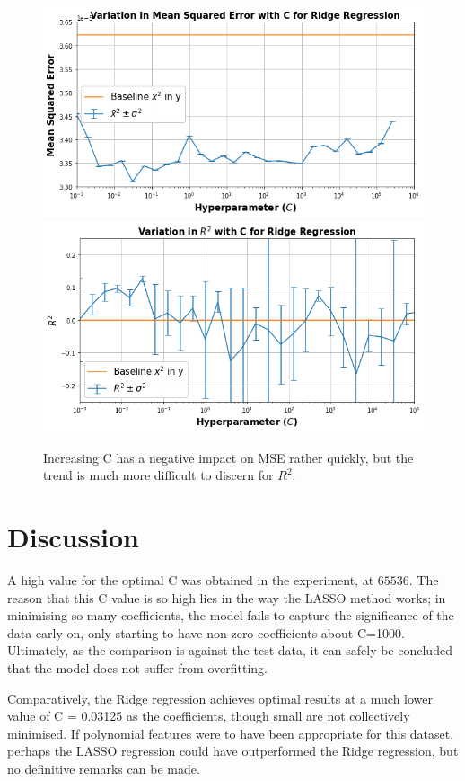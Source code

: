 \begin{figure}[!h]
\begin{small}
\centering
\linespread{1.0}
\includegraphics[width=0.8\linewidth]{pics/Ridge_MSE.png}
\includegraphics[width=0.8\linewidth]{pics/Ridge_R2.png}
\caption{Increasing C has a negative impact on MSE rather quickly, but the trend is much more difficult to discern for $R^2$.}
\label{fig:fig2}
\end{small}
\end{figure}


\section{Discussion}

A high value for the optimal C was obtained in the experiment, at $65536$. The reason that this C value is so high lies in the way the LASSO method works; in minimising so many coefficients, the model fails to capture the significance of the data early on, only starting to have non-zero coefficients about C=1000. Ultimately, as the comparison is against the test data, it can safely be concluded that the model does not suffer from overfitting.

Comparatively, the Ridge regression achieves optimal results at a much lower value of C = 0.03125 as the coefficients, though small are not collectively minimised. If polynomial features were to have been appropriate for this dataset, perhaps the LASSO regression could have outperformed the Ridge regression, but no definitive remarks can be made.


